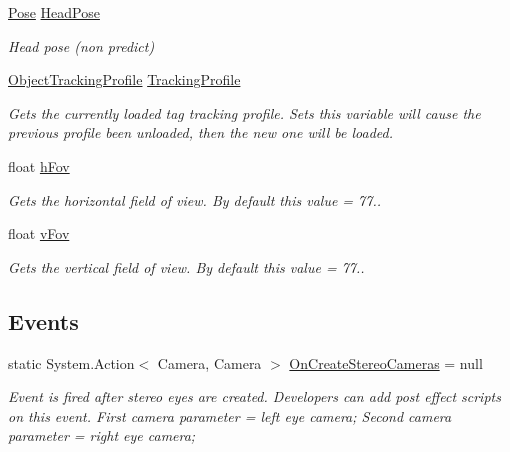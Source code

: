 \begin{DoxyCompactItemize}
\mbox{\hyperlink{struct_ximmerse_1_1_rhino_x_1_1_pose}{Pose}} \mbox{\hyperlink{class_ximmerse_1_1_rhino_x_1_1_a_r_camera_afdc65a0a6965edba5243a12d34a4cb18}{Head\+Pose}}
\begin{DoxyCompactList}\small\item\em Head pose (non predict) \end{DoxyCompactList}\item 
\mbox{\hyperlink{class_ximmerse_1_1_rhino_x_1_1_object_tracking_profile}{Object\+Tracking\+Profile}} \mbox{\hyperlink{class_ximmerse_1_1_rhino_x_1_1_a_r_camera_a3abfd51c012cf14af414f4c7df72de66}{Tracking\+Profile}}
\begin{DoxyCompactList}\small\item\em Gets the currently loaded tag tracking profile. Sets this variable will cause the previous profile been unloaded, then the new one will be loaded. \end{DoxyCompactList}\item 
float \mbox{\hyperlink{class_ximmerse_1_1_rhino_x_1_1_a_r_camera_ace7c430868896aa5cc911f023a0c4ec2}{h\+Fov}}
\begin{DoxyCompactList}\small\item\em Gets the horizontal field of view. By default this value = 77.. \end{DoxyCompactList}\item 
float \mbox{\hyperlink{class_ximmerse_1_1_rhino_x_1_1_a_r_camera_a386210a7a33ca8df7dd6fd8e0530bb55}{v\+Fov}}
\begin{DoxyCompactList}\small\item\em Gets the vertical field of view. By default this value = 77.. \end{DoxyCompactList}\end{DoxyCompactItemize}
\subsection*{Events}
\begin{DoxyCompactItemize}
\item 
static System.\+Action$<$ Camera, Camera $>$ \mbox{\hyperlink{class_ximmerse_1_1_rhino_x_1_1_a_r_camera_a635b0074257b24358550492fa56389e7}{On\+Create\+Stereo\+Cameras}} = null
\begin{DoxyCompactList}\small\item\em Event is fired after stereo eyes are created. Developers can add post effect scripts on this event. First camera parameter = left eye camera; Second camera parameter = right eye camera; \end{DoxyCompactList}\end{DoxyCompactItemize}


